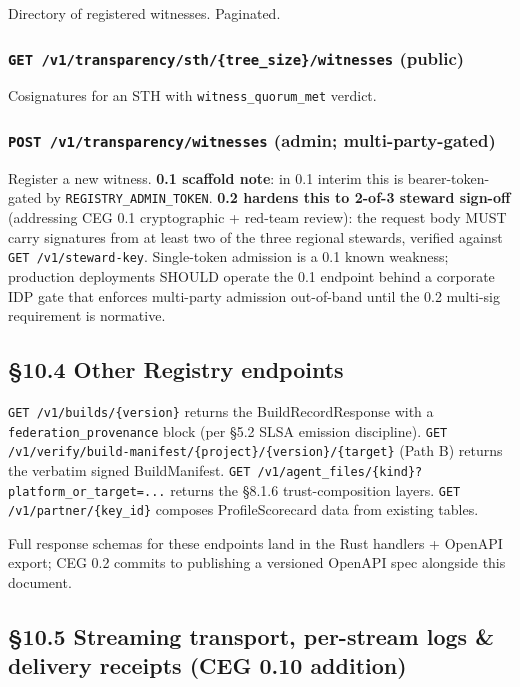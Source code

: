 \documentclass[11pt]{article}
\begin{document}
Directory of registered witnesses. Paginated.


\subsubsection*{\texttt{GET /v1/transparency/sth/\{tree\_size\}/witnesses} (public)}


Cosignatures for an STH with \texttt{witness\_quorum\_met} verdict.


\subsubsection*{\texttt{POST /v1/transparency/witnesses} (admin; multi-party-gated)}


Register a new witness. \textbf{0.1 scaffold note}: in 0.1 interim this is bearer-token-gated by \texttt{REGISTRY\_ADMIN\_TOKEN}. \textbf{0.2 hardens this to 2-of-3 steward sign-off} (addressing CEG 0.1 cryptographic + red-team review): the request body MUST carry signatures from at least two of the three regional stewards, verified against \texttt{GET /v1/steward-key}. Single-token admission is a 0.1 known weakness; production deployments SHOULD operate the 0.1 endpoint behind a corporate IDP gate that enforces multi-party admission out-of-band until the 0.2 multi-sig requirement is normative.


\subsection*{§10.4 Other Registry endpoints}


\texttt{GET /v1/builds/\{version\}} returns the BuildRecordResponse with a \texttt{federation\_provenance} block (per §5.2 SLSA emission discipline). \texttt{GET /v1/verify/build-manifest/\{project\}/\{version\}/\{target\}} (Path B) returns the verbatim signed BuildManifest. \texttt{GET /v1/agent\_files/\{kind\}?platform\_or\_target=...} returns the §8.1.6 trust-composition layers. \texttt{GET /v1/partner/\{key\_id\}} composes ProfileScorecard data from existing tables.


Full response schemas for these endpoints land in the Rust handlers + OpenAPI export; CEG 0.2 commits to publishing a versioned OpenAPI spec alongside this document.


\subsection*{§10.5 Streaming transport, per-stream logs \& delivery receipts (CEG 0.10 addition)}
\end{document}
